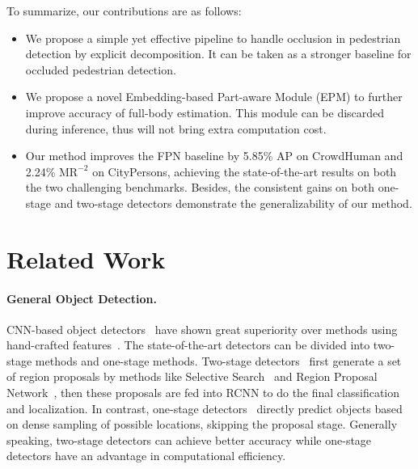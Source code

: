 \documentclass[10pt,twocolumn,letterpaper]{article}
\begin{document}
To summarize, our contributions are as follows:
\begin{itemize}
  \item We propose a simple yet effective pipeline to handle occlusion in pedestrian detection by explicit decomposition. It can be taken as a stronger baseline for occluded pedestrian detection.
 \item We propose a novel Embedding-based Part-aware Module (EPM) to further improve accuracy of full-body estimation. This module can be discarded during inference, thus will not bring extra computation cost.
  \item Our method improves the FPN baseline by 5.85\% AP on CrowdHuman and 2.24\% $\text{MR}^{-2}$ on CityPersons, achieving the state-of-the-art results on both the two challenging benchmarks. Besides, the consistent gains on both one-stage and two-stage detectors demonstrate the generalizability of our method.
\end{itemize}













\section{Related Work}
\paragraph{General Object Detection.}
CNN-based object detectors~\cite{ren2015faster, yolo, liu2016ssd, lin2017focal} have shown great superiority over methods using hand-crafted features~\cite{dollar2014fast, papageorgiou2000trainable}. The state-of-the-art detectors can be divided into two-stage methods and one-stage methods. Two-stage detectors~\cite{girshick2014rich, girshick2015fast, ren2015faster, cai2019cascadercnn} first generate a set of region proposals by methods like Selective Search~\cite{uijlings2013selective} and Region Proposal Network~\cite{ren2015faster}, then these proposals are fed into RCNN to do the final classification and localization. In contrast, one-stage detectors~\cite{yolov3, liu2016ssd, lin2017focal} directly predict objects based on dense sampling of possible locations, skipping the proposal stage. Generally speaking, two-stage detectors can achieve better accuracy while one-stage detectors have an advantage in computational efficiency.
\end{document}

